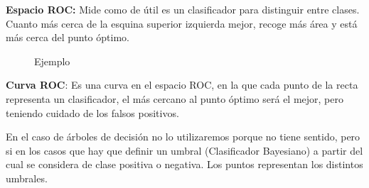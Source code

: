 \documentclass[12pt, twoside, openright]{report} %
\begin{document}
\textbf{Espacio ROC:} Mide como de útil es un clasificador para distinguir entre clases. Cuanto más cerca de la esquina superior izquierda mejor, recoge más área y está más cerca del punto óptimo.
\begin{figure}[H]
	Ejemplo
	{ %

}
\end{figure}
\textbf{Curva ROC}: Es una curva en el espacio ROC, en la que cada punto de la recta representa un clasificador, el más cercano al punto óptimo será el mejor, pero teniendo cuidado de los falsos positivos.

En el caso de árboles de decisión no lo utilizaremos porque no tiene sentido, pero si en los casos que hay que definir un umbral (Clasificador Bayesiano) a partir del cual se considera de clase positiva o negativa. Los puntos representan los distintos umbrales.
\end{document}
